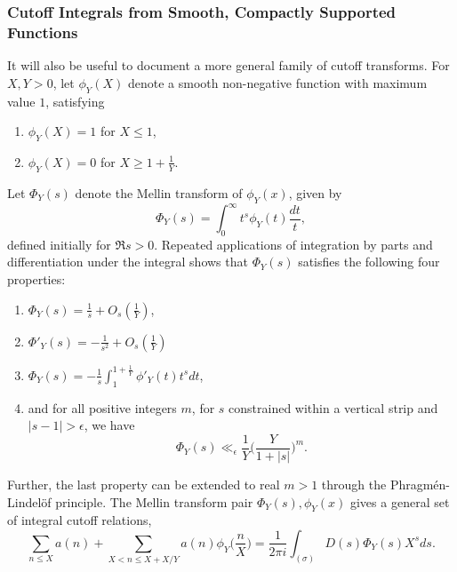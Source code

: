 \subsubsection*{Cutoff Integrals from Smooth, Compactly Supported Functions}


It will also be useful to document a more general family of cutoff transforms.
For $X,Y > 0$, let $\phi_Y(X)$ denote a smooth non-negative function with maximum value $1$,
satisfying
\begin{enumerate}
  \item $\phi_Y(X) = 1$ for $X \leq 1$,
  \item $\phi_Y(X) = 0$ for $X \geq 1 + \frac{1}{Y}$.
\end{enumerate}
Let $\Phi_Y(s)$ denote the Mellin transform of $\phi_Y(x)$, given by
\begin{equation}
  \Phi_Y(s) = \int_0^\infty t^s \phi_Y(t) \frac{dt}{t},
\end{equation}
defined initially for $\Re s > 0$.
Repeated applications of integration by parts and differentiation under the integral shows
that $\Phi_Y(s)$ satisfies the following four properties:
\begin{enumerate}
  \item $\Phi_Y(s) = \frac{1}{s} + O_s(\frac{1}{Y})$,
  \item $\Phi'_Y(s) = -\frac{1}{s^2} + O_s(\frac{1}{Y})$
  \item $\Phi_Y(s) = -\frac{1}{s} \int_1^{1 + \frac{1}{Y}} \phi'_Y(t) t^s dt$,
  \item and for all positive integers $m$, for $s$ constrained within a vertical strip and
    $\lvert s-1 \rvert > \epsilon$, we have
    \begin{equation}
      \Phi_Y(s) \ll_\epsilon \frac{1}{Y} \Big( \frac{Y}{1 + \lvert s \rvert} \Big)^m.
    \end{equation}
\end{enumerate}
Further, the last property can be extended to real $m > 1$ through the
Phragm\'{e}n-Lindel\"{o}f principle.
The Mellin transform pair $\Phi_Y(s), \phi_Y(x)$ gives a general set of integral cutoff
relations,
\begin{equation}
  \sum_{n \leq X} a(n) + \sum_{X < n \leq X + X/Y} a(n) \phi_Y\Big(\frac{n}{X}\Big) =
  \frac{1}{2\pi i} \int_{(\sigma)} D(s) \Phi_Y(s) X^s ds.
\end{equation}

